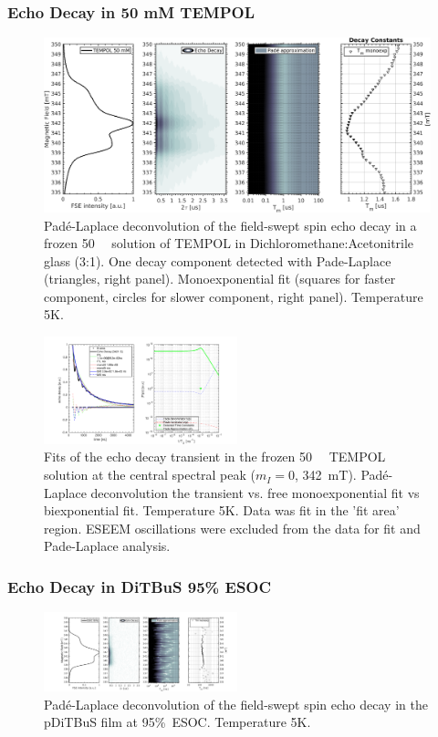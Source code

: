 \subsubsection{Echo Decay in 50 mM TEMPOL}
\begin{figure}[ht!]
\center
	\includegraphics[width=1\textwidth]{./pulse/figures/Figure_S8.png}
	\caption{Pad{\'e}-Laplace deconvolution of the field-swept spin echo decay in a frozen 50~\si{\milli\Molar}  solution of TEMPOL in Dichloromethane:Acetonitrile glass (3:1). One decay component detected with Pade-Laplace (triangles, right panel). Monoexponential fit (squares for faster component, circles for slower component, right panel). Temperature 5K.}
	\label{fig:Figure_S8}
\end{figure}

\begin{figure}[ht!]
\center
	\includegraphics[width=0.5\textwidth]{./pulse/figures/Figure_S9.pdf}
	\caption{Fits of the echo decay transient in the frozen 50~\si{\milli\Molar}  TEMPOL solution at the central spectral peak ($m_I=0$, 342~mT). Pad{\'e}-Laplace deconvolution the transient vs. free monoexponential fit vs biexponential fit. Temperature 5K. Data was fit in the 'fit area' region. ESEEM oscillations were excluded from the data for fit and Pade-Laplace analysis.}
	\label{fig:Figure_S9}
\end{figure}


\newpage
\subsubsection{Echo Decay in DiTBuS 95\% ESOC}
\begin{figure}[h]
\center
	\includegraphics[width=0.5\textwidth]{./pulse/figures/Figure_S10.pdf}
	\caption{Pad{\'e}-Laplace deconvolution of the field-swept spin echo decay in the pDiTBuS film at 95\%~ESOC. Temperature 5K.}
	\label{fig:Figure_S10}
\end{figure}


